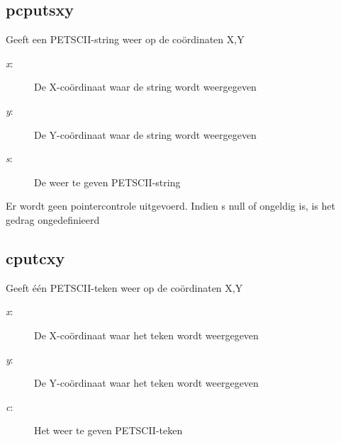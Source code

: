 \subsection{pcputsxy}
\begin{description}[leftmargin=2.4cm,style=nextline]
\item [Beschrijving:] {Geeft een PETSCII-string weer op de coördinaten X,Y}\item [Syntaxis:] \item [Parameters:]
\begin{description}
\item [{\em x}:] {De X-coördinaat waar de string   wordt weergegeven}\item [{\em y}:] {De Y-coördinaat waar de string wordt weergegeven}\item [{\em s}:] {De weer te geven PETSCII-string}
\end{description}
\item [Opmerkingen:] {Er wordt geen pointercontrole uitgevoerd.  Indien s null of ongeldig is,   is het gedrag ongedefinieerd }
\end{description}

\subsection{cputcxy}
\begin{description}[leftmargin=2.4cm,style=nextline]
\item [Beschrijving:] {Geeft één PETSCII-teken weer op de coördinaten X,Y}\item [Syntaxis:] \item [Parameters:]
\begin{description}
\item [{\em x}:] {De X-coördinaat waar het teken   wordt weergegeven}\item [{\em y}:] {De Y-coördinaat waar het teken wordt weergegeven}\item [{\em c}:] {Het weer te geven PETSCII-teken}
\end{description}
\end{description}

